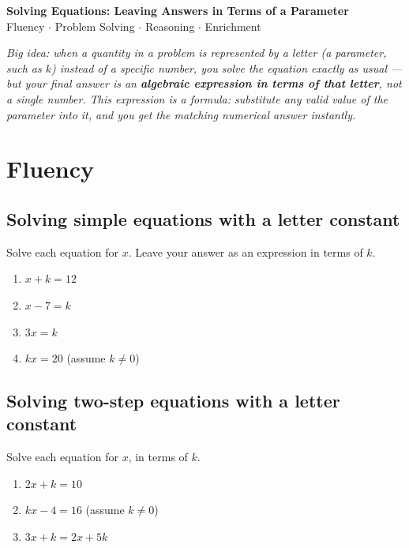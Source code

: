 \documentclass[11pt]{article}
\newcommand{\worksheettitle}{Solving Equations: Leaving Answers in Terms of a Parameter}
\newcommand{\qspace}{\vspace{1.0cm}}
\begin{document}
\begin{center}
  {\Large\bfseries \worksheettitle}\\[0.3em]
  {\normalsize Fluency \(\cdot\) Problem Solving \(\cdot\) Reasoning \(\cdot\) Enrichment}
\end{center}

\vspace{0.3em}
\noindent\textit{Big idea: when a quantity in a problem is represented by a letter (a parameter, such as $k$) instead of a specific number, you solve the equation exactly as usual --- but your final answer is an \textbf{algebraic expression in terms of that letter}, not a single number. This expression is a formula: substitute any valid value of the parameter into it, and you get the matching numerical answer instantly.}

\vspace{0.5em}

\section{Fluency}

\subsection*{Solving simple equations with a letter constant}
Solve each equation for $x$. Leave your answer as an expression in terms of $k$.

\begin{enumerate}
  \item $x + k = 12$
  \qspace
  \item $x - 7 = k$
  \qspace
  \item $3x = k$
  \qspace
  \item $kx = 20$ \quad (assume $k \neq 0$)
  \qspace
\end{enumerate}

\subsection*{Solving two-step equations with a letter constant}
Solve each equation for $x$, in terms of $k$.

\begin{enumerate}[resume]
  \item $2x + k = 10$
  \qspace
  \item $kx - 4 = 16$ \quad (assume $k \neq 0$)
  \qspace
  \item $3x + k = 2x + 5k$
  \qspace
\end{enumerate}
\end{document}
